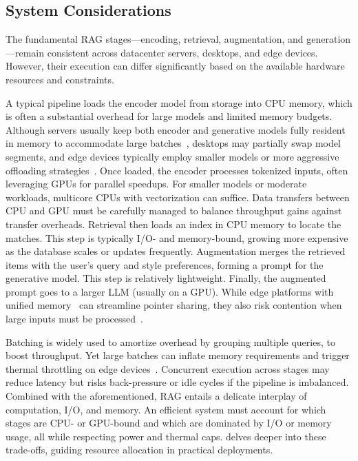 \subsection{System Considerations}
\label{sec:classical_pipeline}

The fundamental RAG stages---encoding, retrieval, augmentation, and generation---remain consistent across datacenter servers, desktops, and edge devices. However, their execution can differ significantly based on the available hardware resources and constraints.

A typical pipeline loads the encoder model from storage into CPU memory, which is often a substantial overhead for large models and limited memory budgets. Although servers usually keep both encoder and generative models fully resident in memory to accommodate large batches~\cite{jiang2024piperag, jin2024flashrag, jiang2024megascale}, desktops may partially swap model segments, and edge devices typically employ smaller models or more aggressive offloading strategies~\cite{EdgeRAG,NanoLLM}.
Once loaded, the encoder processes tokenized inputs, often leveraging GPUs for parallel speedups. For smaller models or moderate workloads, multicore CPUs with vectorization can suffice. Data transfers between CPU and GPU must be carefully managed to balance throughput gains against transfer overheads. Retrieval then loads an index in CPU memory to locate the \topk matches. This step is typically I/O- and memory-bound, growing more expensive as the database scales or updates frequently.
Augmentation merges the retrieved items with the user's query and style preferences, forming a prompt for the generative model. This step is relatively lightweight. Finally, the augmented prompt goes to a larger LLM (usually on a GPU). While edge platforms with unified memory~\cite{ying2022exploiting} can streamline pointer sharing, they also risk contention when large inputs must be processed~\cite{kim2020batch, dashti2017analyzing, cavicchioli2017memory, jeong2012qos}.

Batching is widely used to amortize overhead by grouping multiple queries, to boost throughput.
Yet large batches can inflate memory requirements and trigger thermal throttling on edge devices~\cite{na2021scalable, stojkovic2025tapas}. Concurrent execution across stages may reduce latency but risks back-pressure or idle cycles if the pipeline is imbalanced.
Combined with the aforementioned, RAG entails a delicate interplay of computation, I/O, and memory. An efficient system must account for which stages are CPU- or GPU-bound and which are dominated by I/O or memory usage, all while respecting power and thermal caps.
 delves deeper into these trade-offs, guiding resource allocation in practical deployments.

